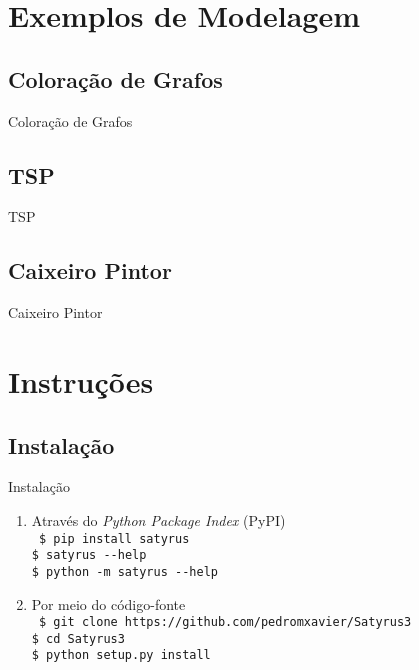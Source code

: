 \documentclass[brazil, MathSerif, aspectratio = 169]{beamer}
\begin{document}
\section{Exemplos de Modelagem}
\SectionPage

\subsection{Coloração de Grafos}
\begin{frame}{Coloração de Grafos}

\end{frame}

\subsection{TSP}
\begin{frame}{TSP}

\end{frame}

\subsection{Caixeiro Pintor}
\begin{frame}{Caixeiro Pintor}

\end{frame}

\section{Instruções}

\subsection{Instalação}
\begin{frame}%
    {Instalação}

    \begin{enumerate}
        \item Através do \textit{Python Package Index} (PyPI)\\%
              \texttt{%
                  \$ pip install satyrus\\%
                  \$ satyrus {-}{-}help\\%
                  \$ python -m satyrus {-}{-}help
              }
        \item Por meio do código-fonte\\%
              \texttt{%
                  \$ git clone https://github.com/pedromxavier/Satyrus3\\%
                  \$ cd Satyrus3\\%
                  \$ python setup.py install
              }
    \end{enumerate}
\end{frame}
\end{document}
